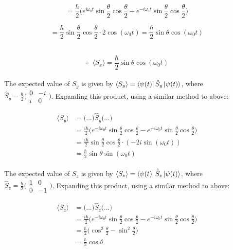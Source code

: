 \documentclass[14pt]{extarticle}
\begin{document}
$$= \frac \hbar 2 \bigg( e^{i\omega_0 t} \sin \frac \theta 2 \cos \frac\theta 2 + e^{-i\omega_0 t} \sin \frac \theta 2 \cos \frac \theta 2 \bigg)$$ 

$$= \frac \hbar 2 \sin\frac \theta 2 \cos\frac \theta 2 \cdot 2\cos(\omega_0t) = \frac \hbar 2 \sin\theta \cos(\omega_0 t)$$ \ 

$$\therefore \;\; \langle S_x \rangle = \frac \hbar 2 \sin\theta \cos(\omega_0 t)$$ \\ 

The expected value of $S_y$ is given by $\langle S_y \rangle = \bra{\psi(t)} \hat S_y \ket{\psi(t)}$, where $\hat S_y =\frac \hbar 2 \big( \begin{smallmatrix} 0 & -i \\ i & 0 \end{smallmatrix} \big)$. Expanding this product, using a similar method to above:

$$
\begin{aligned}
	\langle S_y \rangle &= \big( ... \big) \hat S_y \big( ... \big) \\ 
	&= \frac{i\hbar}{2} \bigg( e^{-i\omega_0 t} \sin\frac\theta 2 \cos\frac\theta 2 - e^{-i\omega_0t} \sin\frac\theta 2 \cos\frac\theta 2 \bigg) \\ 
	&= \frac{i\hbar}{2} \sin\frac\theta 2 \cos\frac\theta 2 \cdot (-2i\sin(\omega_0t)) \\  
	&= \frac \hbar 2 \sin\theta \sin(\omega_0t)
\end{aligned}
$$ \\ 

The expected value of $S_z$ is given by $\langle S_z\rangle = \bra{\psi(t)} \hat S_z \ket{\psi(t)}$, where $\hat S_z = \frac \hbar 2 \big( \begin{smallmatrix} 1 & 0 \\ 0 & -1 \end{smallmatrix} \big)$. Expanding this product, using a similar method to above:

$$
\begin{aligned}
        \langle S_z \rangle &= \big( ... \big) \hat S_z \big( ... \big) \\ 
        &= \frac{i\hbar}{2} \bigg( e^{-i\omega_0 t} \sin\frac\theta 2 \cos\frac\theta 2 - e^{-i\omega_0t} \sin\frac\theta 2 \cos\frac\theta 2 \bigg) \\ 
        &= \frac \hbar 2 \bigg( \cos^2\frac\theta 2 - \sin^2\frac\theta 2 \bigg) \\ 
        &= \frac \hbar 2 \cos\theta 
\end{aligned}
$$ \\
\end{document}
